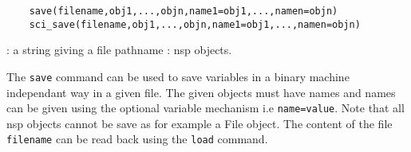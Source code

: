 \begin{mandesc}
\end{mandesc}

\begin{calling_sequence}
  \begin{verbatim}
    save(filename,obj1,...,objn,name1=obj1,...,namen=objn)  
    sci_save(filename,obj1,...,objn,name1=obj1,...,namen=objn)  
  \end{verbatim}
\end{calling_sequence}
\begin{parameters}
  \begin{varlist}
    : a string giving a file pathname 
    : nsp objects. 
  \end{varlist}
\end{parameters}
\begin{mandescription}
  The \verb!save! command can be used to save variables in a binary machine independant way 
  in a given file. The given objects must have names and names can be given using the optional 
  variable mechanism i.e \verb+name=value+. Note that all nsp objects cannot be save as for example 
  a File object. The content of the file \verb+filename+ can be read back using the \verb+load+ command.
\end{mandescription}
\begin{examples}
  \begin{program}
  \end{program}
\end{examples}
\begin{manseealso}
\end{manseealso}

